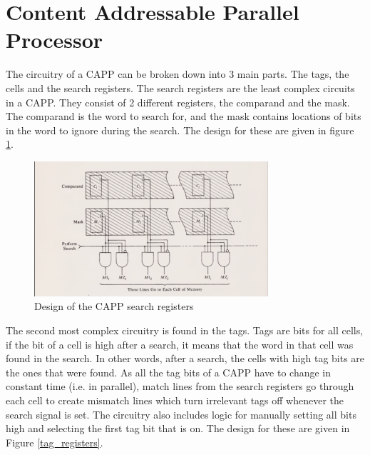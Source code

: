 \section{Content Addressable Parallel Processor}
The circuitry of a CAPP can be broken down into 3 main parts. The tags, the cells and the search registers. 
The search registers are the least complex circuits in a CAPP. They consist of 2 different registers, the comparand and the mask. 
The comparand is the word to search for, and the mask contains locations of bits in the word to ignore during the search.
The design for these are given in figure \ref{search_circuit}.

\begin{figure}
  \includegraphics[height=5cm]{FPGA-CAPP research paper/images/search_registers.png}
  \caption{Design of the CAPP search registers}
  \label{search_circuit}
\end{figure}

The second most complex circuitry is found in the tags. Tags are bits for all cells, if the bit of a cell is high after a search, it means that the word in that cell was found in the search. In other words, after a search, the cells with high tag bits are the ones that were found. As all the tag bits of a CAPP have to change in constant time (i.e. in parallel), match lines from the search registers go through each cell to create mismatch lines which turn irrelevant tags off whenever the search signal is set. The circuitry also includes logic for manually setting all bits high and selecting the first tag bit that is on. The design for these are given in Figure \ref{tag_registers}.

